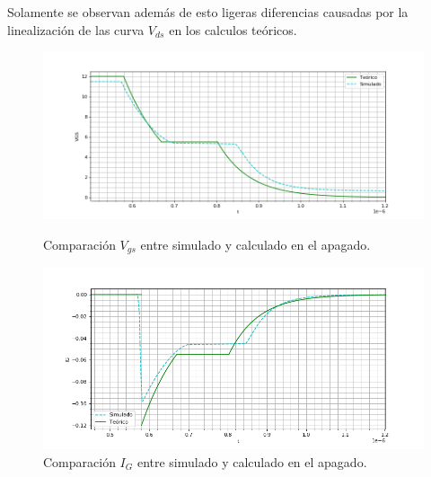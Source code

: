 Solamente se observan además de esto ligeras diferencias causadas por la linealización de las curva $V_{ds}$ en los calculos teóricos.

\begin{figure}[H]
	\centering
	\begin{minipage}{0.5\textwidth}
		\centering
		\includegraphics[width=1.1\textwidth]{ImagenesEjercicio-1/sim_apagado_gate} %
		\caption{Comparación $V_{gs}$ entre simulado y calculado en el apagado.}
		\label{ej1:fig:sim_apagado_gate}
	\end{minipage}\hfill
	\begin{minipage}{0.5\textwidth}
		\centering
		\includegraphics[width=1.1\textwidth]{ImagenesEjercicio-1/sim_apagado_gate_i} %
		\caption{Comparación $I_{G}$ entre simulado y calculado en el apagado.}
		\label{ej1:fig:sim_apagado_gate_i}
	\end{minipage}
\end{figure}

